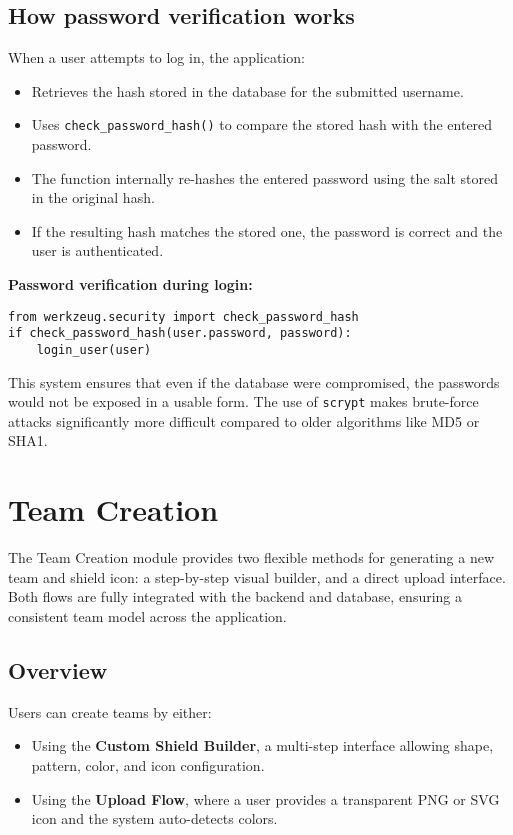 \documentclass[12pt]{article}
\begin{document}
\subsection*{How password verification works}

When a user attempts to log in, the application:
\begin{itemize}
  \item Retrieves the hash stored in the database for the submitted username.
  \item Uses \texttt{check\_password\_hash()} to compare the stored hash with the entered password.
  \item The function internally re-hashes the entered password using the salt stored in the original hash.
  \item If the resulting hash matches the stored one, the password is correct and the user is authenticated.
\end{itemize}

\noindent \textbf{Password verification during login:}
\begin{verbatim}
from werkzeug.security import check_password_hash
if check_password_hash(user.password, password):
    login_user(user)
\end{verbatim}

This system ensures that even if the database were compromised, the passwords would not be exposed in a usable form. The use of \texttt{scrypt} makes brute-force attacks significantly more difficult compared to older algorithms like MD5 or SHA1.

\section{Team Creation}

The Team Creation module provides two flexible methods for generating a new team and shield icon: a step-by-step visual builder, and a direct upload interface. Both flows are fully integrated with the backend and database, ensuring a consistent team model across the application.

\subsection{Overview}

Users can create teams by either:
\begin{itemize}
    \item Using the \textbf{Custom Shield Builder}, a multi-step interface allowing shape, pattern, color, and icon configuration.
    \item Using the \textbf{Upload Flow}, where a user provides a transparent PNG or SVG icon and the system auto-detects colors.
\end{itemize}
\end{document}
